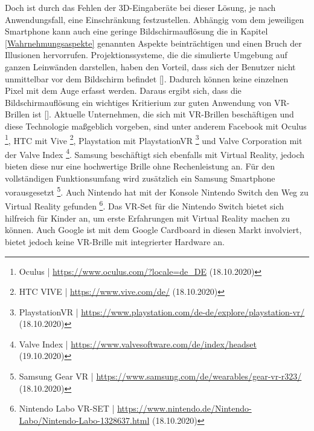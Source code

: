 \documentclass[a4paper,12pt,oneside]{article}
\begin{document}
        Doch ist durch das Fehlen der 3D-Eingaberäte bei dieser Lösung, je
        nach Anwendungsfall, eine Einschränkung festzustellen. Abhängig vom dem 
        jeweiligen Smartphone kann 
        auch eine geringe
        Bildschirmauflösung die in Kapitel \ref{Wahrnehmungsaspekte} genannten Aspekte
        beinträchtigen und einen Bruch der Illusionen hervorrufen.
        Projektionssysteme, die die simulierte Umgebung auf ganzen Leinwänden darstellen,
        haben den Vorteil, dass sich der Benutzer nicht unmittelbar vor dem Bildschirm
        befindet [\cite[134]{Dorner2013}]. Dadurch können keine einzelnen Pixel mit dem Auge 
        erfasst werden. Daraus ergibt sich, dass die Bildschirmauflösung ein wichtiges
        Kritierium zur guten Anwendung von VR-Brillen ist [\cite[134]{Dorner2013}].
        Aktuelle Unternehmen, die sich mit VR-Brillen beschäftigen und diese Technologie
        maßgeblich vorgeben, sind unter anderem Facebook mit Oculus
        \footnote{Oculus | \url{https://www.oculus.com/?locale=de_DE} (18.10.2020)}, 
        HTC mit Vive \footnote{HTC VIVE | \url{https://www.vive.com/de/} (18.10.2020)},
        Playstation mit PlaystationVR
        \footnote{PlaystationVR | \url{https://www.playstation.com/de-de/explore/playstation-vr/} (18.10.2020)}
        und Valve Corporation mit der Valve Index
        \footnote{Valve Index | \url{https://www.valvesoftware.com/de/index/headset} (19.10.2020)}.
        Samsung beschäftigt sich ebenfalls mit Virtual
        Reality, jedoch bieten diese nur eine hochwertige Brille ohne Rechenleistung an.
        Für den vollständigen Funktionsumfang wird zusätzlich ein Samsung Smartphone vorausgesetzt
        \footnote{Samsung Gear VR | \url{https://www.samsung.com/de/wearables/gear-vr-r323/} (18.10.2020)}.
        Auch Nintendo hat mit der Konsole Nintendo Switch den Weg zu Virtual Reality
        gefunden
        \footnote{Nintendo Labo VR-SET | \url{https://www.nintendo.de/Nintendo-Labo/Nintendo-Labo-1328637.html} (18.10.2020)}.
        Das VR-Set für die Nintendo Switch bietet sich hilfreich für Kinder an, um erste 
        Erfahrungen mit Virtual Reality machen zu können.
        Auch Google ist mit dem Google Cardboard in diesen Markt involviert, bietet jedoch keine 
        VR-Brille mit integrierter Hardware an.
\end{document}

